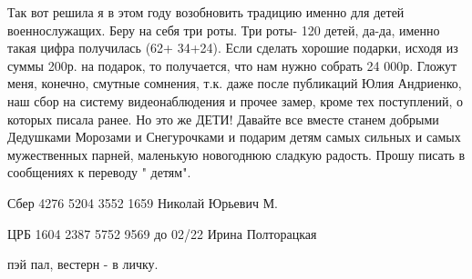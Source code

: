 Так вот решила я в этом году возобновить традицию именно для детей
военнослужащих. Беру на себя три роты. Три роты- 120 детей, да-да, именно такая
цифра получилась (62+ 34+24). Если сделать хорошие подарки, исходя из суммы
200р. на подарок, то получается, что нам нужно собрать 24 000р. Гложут меня,
конечно, смутные сомнения, т.к. даже после публикаций Юлия Андриенко, наш сбор
на систему видеонаблюдения и прочее замер, кроме тех поступлений, о которых
писала ранее. Но это же ДЕТИ! Давайте все вместе станем добрыми Дедушками
Морозами и Снегурочками и подарим детям самых сильных и самых мужественных
парней, маленькую новогоднюю сладкую радость. Прошу писать в сообщениях к
переводу " детям".

Сбер 4276 5204 3552 1659 Николай Юрьевич М.

ЦРБ 1604 2387 5752 9569 до 02/22 Ирина Полторацкая

пэй пал, вестерн - в личку.

